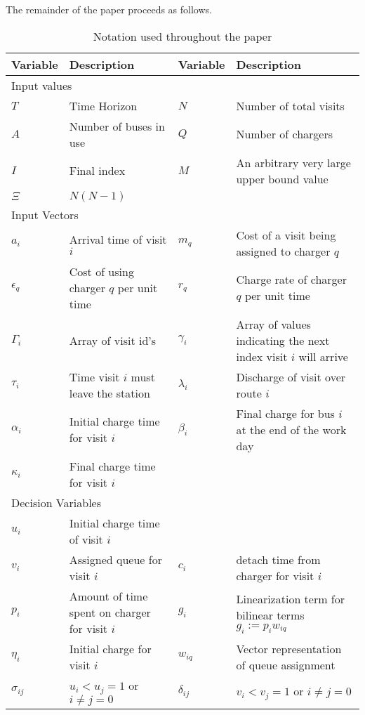 \documentclass[letterpaper, 10pt, conference]{IEEEtran}
\begin{document}
The remainder of the paper proceeds as follows.
\begin{table*}[!t]
	\caption{Notation used throughout the paper}
	\label{tab:variables}
	\centering
	\begin{tabular}{l l l l}
		\toprule
		\textbf{Variable} & \textbf{Description} & \textbf{Variable} & \textbf{Description} \\
		\toprule
		\multicolumn{4}{l}{Input values} \\
			$T$         & Time Horizon           &
			$N$         & Number of total visits                    \\
			$A$         & Number of buses in use &
			$Q$         & Number of chargers                        \\
			$I$         & Final index            &
			$M$         & An arbitrary very large upper bound value \\
			$\Xi$       & $N(N-1)$                                   \\
		\hline
		\multicolumn{4}{l}{Input Vectors} \\
			$a_i$        & Arrival time of visit  $i$              &
			$m_q$        & Cost of a visit being assigned to charger  $q$                  \\
			$\epsilon_q$ & Cost of using charger $q$ per unit time &
			$r_q$        & Charge rate of charger $q$ per unit time                        \\
			$\Gamma_i$   & Array of visit id's                     &
			$\gamma_i$   & Array of values indicating the next index visit $i$ will arrive \\
			$\tau_i$     & Time visit $i$ must leave the station   &
			$\lambda_i$  & Discharge of visit over route  $i$                              \\
			$\alpha_i$   & Initial charge time for visit  $i$      &
			$\beta_{i}$  & Final charge for bus $i$ at the end of the work day             \\
			$\kappa_i$   & Final charge time for visit $i$                                 \\
		\hline
		\multicolumn{4}{l}{Decision Variables} \\
			$u_i$         & Initial charge time of visit $i$                          \\
			$v_i$         & Assigned queue for visit $i$                  &
			$c_i$         & detach time from charger for visit $i$                    \\
			$p_i$         & Amount of time spent on charger for visit $i$ &
			$g_i$         & Linearization term for bilinear terms $g_i := p_i w_{iq}$ \\
			$\eta_i$      & Initial charge for visit $i$                  &
			$w_{iq}$      & Vector representation of queue assignment                 \\
			$\sigma_{ij}$ & $u_i < u_j = 1$ \textrm{ or } $i \neq j = 0$  &
			$\delta_{ij}$ & $v_i < v_j = 1$ \textrm{ or } $i \neq j = 0$              \\
			\bottomrule
	\end{tabular}
\end{table*}
\end{document}
